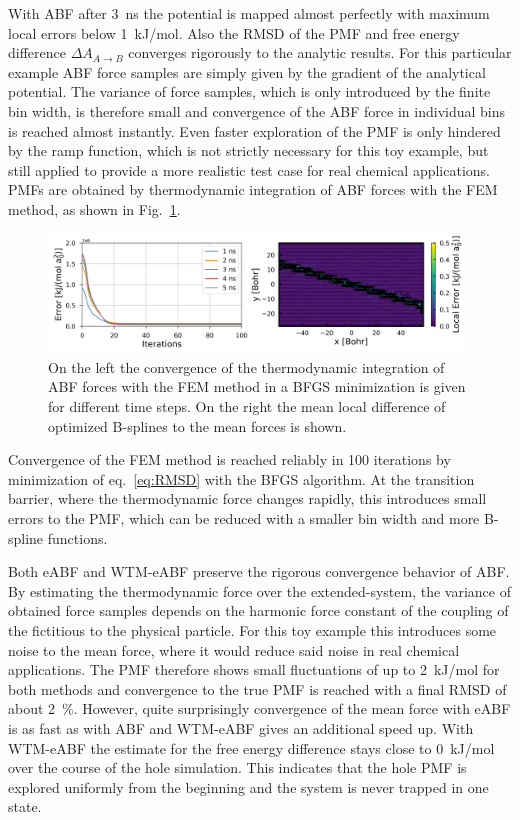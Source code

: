 With ABF after 3~ns the potential is mapped almost perfectly with maximum local errors below 1~kJ/mol. Also the RMSD of the PMF and free energy difference $\Delta A_{A\to B}$ converges rigorously to the analytic results.
For this particular example ABF force samples are simply given by the gradient of the analytical potential.
The variance of force samples, which is only introduced by the finite bin width, is therefore small and convergence of the ABF force in individual bins is reached almost instantly.
Even faster exploration of the PMF is only hindered by the ramp function, which is not strictly necessary for this toy example, but still applied to provide a more realistic test case for real chemical applications.
PMFs are obtained by thermodynamic integration of ABF forces with the FEM method, as shown in Fig.~\ref{fig:ti}.
\begin{figure}[H]
  \centering
  \includegraphics[width=0.99\textwidth]{bilder/test_2D/ti}
  \caption{On the left the convergence of the thermodynamic integration of ABF forces with the FEM method in a BFGS minimization is given for different time steps. On the right the mean local difference of optimized B-splines to the mean forces is shown.}
\label{fig:ti}%
\end{figure}
Convergence of the FEM method is reached reliably in 100 iterations by minimization of eq.~\ref{eq:RMSD} with the BFGS algorithm.
At the transition barrier, where the thermodynamic force changes rapidly, this introduces small errors to the PMF, which can be reduced with a smaller bin width and more B-spline functions.

Both eABF and WTM-eABF preserve the rigorous convergence behavior of ABF.
By estimating the thermodynamic force over the extended-system, the variance of obtained force samples depends on the harmonic force constant of the coupling of the fictitious to the physical particle.
For this toy example this introduces some noise to the mean force, where it would reduce said noise in real chemical applications.\autocite{lesage2017smoothed}
The PMF therefore shows small fluctuations of up to 2~kJ/mol for both methods and convergence to the true PMF is reached with a final RMSD of about 2~\%.
However, quite surprisingly convergence of the mean force with eABF is as fast as with ABF and WTM-eABF gives an additional speed up.
With WTM-eABF the estimate for the free energy difference stays close to 0~kJ/mol over the course of the hole simulation.
This indicates that the hole PMF is explored uniformly from the beginning and the system is never trapped in one state.

